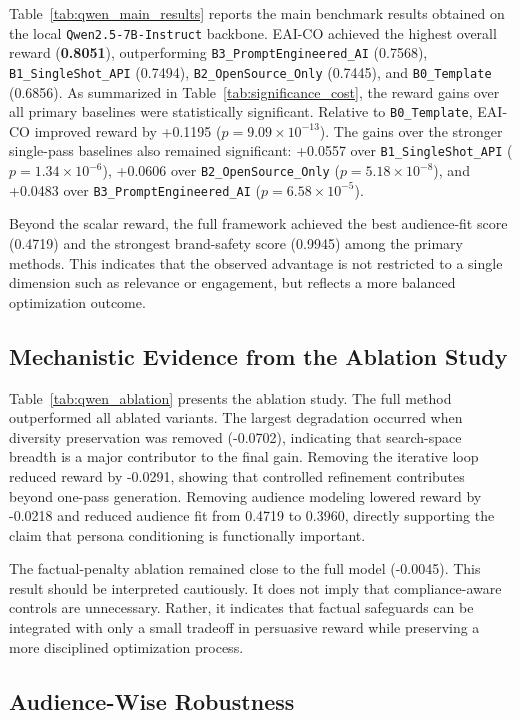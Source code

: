 \documentclass[applsci,article,submit,pdftex,moreauthors]{Definitions/mdpi}
\begin{document}
Table~\ref{tab:qwen_main_results} reports the main benchmark results obtained on the local \texttt{Qwen2.5-7B-Instruct} backbone. EAI-CO achieved the highest overall reward (\textbf{0.8051}), outperforming \texttt{B3\_PromptEngineered\_AI} (0.7568), \texttt{B1\_SingleShot\_API} (0.7494), \texttt{B2\_OpenSource\_Only} (0.7445), and \texttt{B0\_Template} (0.6856). As summarized in Table~\ref{tab:significance_cost}, the reward gains over all primary baselines were statistically significant. Relative to \texttt{B0\_Template}, EAI-CO improved reward by +0.1195 ($p = 9.09 \times 10^{-13}$). The gains over the stronger single-pass baselines also remained significant: +0.0557 over \texttt{B1\_SingleShot\_API} ($p = 1.34 \times 10^{-6}$), +0.0606 over \texttt{B2\_OpenSource\_Only} ($p = 5.18 \times 10^{-8}$), and +0.0483 over \texttt{B3\_PromptEngineered\_AI} ($p = 6.58 \times 10^{-5}$).

Beyond the scalar reward, the full framework achieved the best audience-fit score (0.4719) and the strongest brand-safety score (0.9945) among the primary methods. This indicates that the observed advantage is not restricted to a single dimension such as relevance or engagement, but reflects a more balanced optimization outcome.

\subsection{Mechanistic Evidence from the Ablation Study}

Table~\ref{tab:qwen_ablation} presents the ablation study. The full method outperformed all ablated variants. The largest degradation occurred when diversity preservation was removed (-0.0702), indicating that search-space breadth is a major contributor to the final gain. Removing the iterative loop reduced reward by -0.0291, showing that controlled refinement contributes beyond one-pass generation. Removing audience modeling lowered reward by -0.0218 and reduced audience fit from 0.4719 to 0.3960, directly supporting the claim that persona conditioning is functionally important.

The factual-penalty ablation remained close to the full model (-0.0045). This result should be interpreted cautiously. It does not imply that compliance-aware controls are unnecessary. Rather, it indicates that factual safeguards can be integrated with only a small tradeoff in persuasive reward while preserving a more disciplined optimization process.

\subsection{Audience-Wise Robustness}
\end{document}
